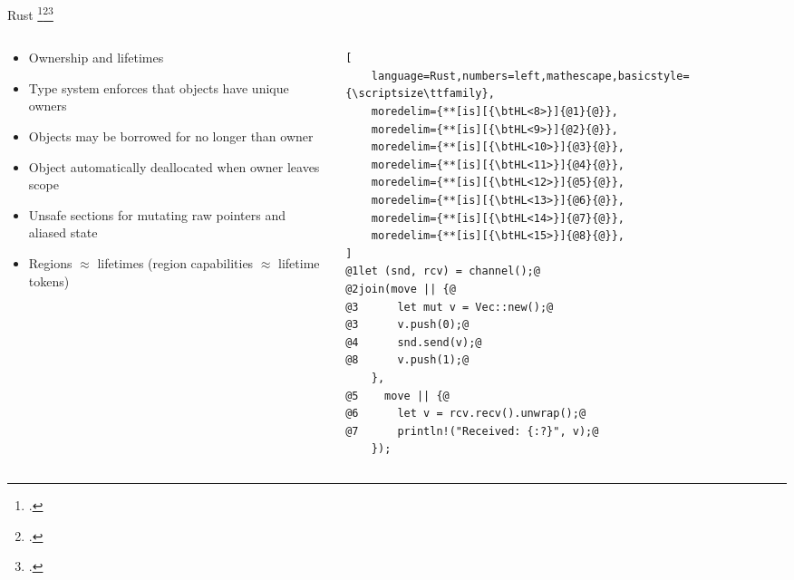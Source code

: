 \documentclass[aspectratio=169]{beamer}
\begin{document}
\begin{frame}[fragile]{Rust \footcite{matsakis_rust_2014}\footcite{levy_ownership_2015}\footcite{jung_rustbelt:_2017}}
\footnotesize
    \begin{columns}
    \begin{column}{0.46\textwidth}

    \begin{itemize}[<+->]
        \item Ownership and lifetimes 
        \item Type system enforces that objects have unique \alert{owners} 
        \item Objects may be borrowed for no longer than owner 
        \item Object automatically \alert{deallocated} when owner leaves scope
        \item Unsafe sections for mutating raw pointers and aliased state 
        \item Regions $\approx$ lifetimes (region capabilities $\approx$ lifetime tokens)
    \end{itemize}

    \vspace{0.1in}
    \end{column}

    \pause

    \begin{column}{0.46\textwidth}
\begin{lstlisting}[
    language=Rust,numbers=left,mathescape,basicstyle={\scriptsize\ttfamily},
    moredelim={**[is][{\btHL<8>}]{@1}{@}},
    moredelim={**[is][{\btHL<9>}]{@2}{@}},
    moredelim={**[is][{\btHL<10>}]{@3}{@}},
    moredelim={**[is][{\btHL<11>}]{@4}{@}},
    moredelim={**[is][{\btHL<12>}]{@5}{@}},
    moredelim={**[is][{\btHL<13>}]{@6}{@}},
    moredelim={**[is][{\btHL<14>}]{@7}{@}},
    moredelim={**[is][{\btHL<15>}]{@8}{@}},
]
@1let (snd, rcv) = channel();@
@2join(move || {@
@3      let mut v = Vec::new();@
@3      v.push(0);@
@4      snd.send(v);@
@8      v.push(1);@
    },
@5    move || {@
@6      let v = rcv.recv().unwrap();@
@7      println!("Received: {:?}", v);@
    });
\end{lstlisting}
\end{column}
\end{columns}

\end{frame}
\end{document}
